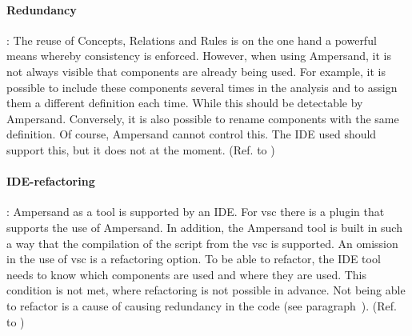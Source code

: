 \paragraph{\textbf{Redundancy}}\label{swot:t_redundancy_script_tool}:
The reuse of Concepts, Relations and Rules is on the one hand a powerful means whereby consistency is enforced.
However, when using Ampersand, it is not always visible that components are already being used.
For example, it is possible to include these components several times in the analysis and to assign them a different definition each time.
While this should be detectable by Ampersand.
Conversely, it is also possible to rename components with the same definition.
Of course, Ampersand cannot control this.
The IDE used should support this, but it does not at the moment.
(Ref. to )

\paragraph{\textbf{IDE-refactoring}}\label{swot:t_ide_refactoring}:
Ampersand as a tool is supported by an IDE.
For \acrshort{vsc} there is a plugin that supports the use of Ampersand.
In addition, the Ampersand tool is built in such a way that the compilation of the script from the \acrshort{vsc} is supported.
An omission in the use of \acrshort{vsc} is a refactoring option.
To be able to refactor, the IDE tool needs to know which components are used and where they are used.
This condition is not met, where refactoring is not possible in advance.
Not being able to refactor is a cause of causing redundancy in the code (see paragraph~).
(Ref. to )



